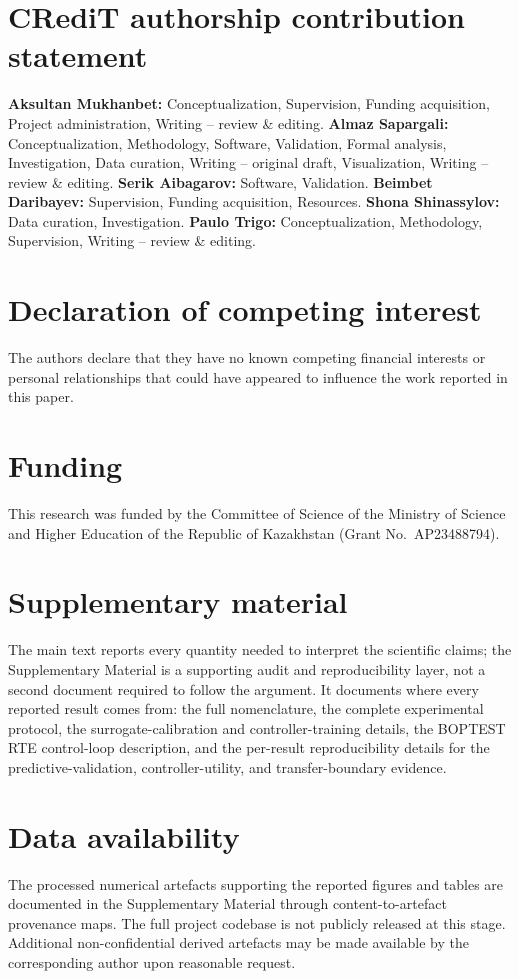 \documentclass[a4paper,fleqn]{cas-sc}
\begin{document}
\section*{CRediT authorship contribution statement}
\textbf{Aksultan Mukhanbet:} Conceptualization, Supervision, Funding acquisition, Project administration, Writing -- review \& editing. \textbf{Almaz Sapargali:} Conceptualization, Methodology, Software, Validation, Formal analysis, Investigation, Data curation, Writing -- original draft, Visualization, Writing -- review \& editing. \textbf{Serik Aibagarov:} Software, Validation. \textbf{Beimbet Daribayev:} Supervision, Funding acquisition, Resources. \textbf{Shona Shinassylov:} Data curation, Investigation. \textbf{Paulo Trigo:} Conceptualization, Methodology, Supervision, Writing -- review \& editing.

\section*{Declaration of competing interest}
The authors declare that they have no known competing financial interests or
personal relationships that could have appeared to influence the work reported in
this paper.

\section*{Funding}
This research was funded by the Committee of Science of the Ministry of Science and Higher Education of the Republic of Kazakhstan (Grant No.~AP23488794).

\section*{Supplementary material}
The main text reports every quantity needed to interpret the scientific claims; the Supplementary Material is a supporting audit and reproducibility layer, not a second document required to follow the argument. It documents where every reported result comes from: the full nomenclature, the complete experimental protocol, the surrogate-calibration and controller-training details, the BOPTEST RTE control-loop description, and the per-result reproducibility details for the predictive-validation, controller-utility, and transfer-boundary evidence.

\section*{Data availability}
The processed numerical artefacts supporting the reported figures and tables are documented in the Supplementary Material through content-to-artefact provenance maps. The full project codebase is not publicly released at this stage. Additional non-confidential derived artefacts may be made available by the corresponding author upon reasonable request.
\end{document}
